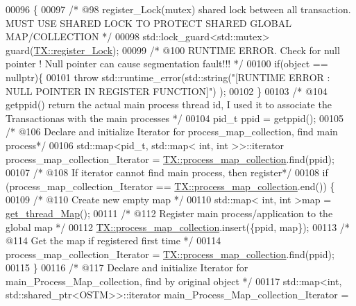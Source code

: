 \begin{DoxyCode}
00096                                              \{
00097     \textcolor{comment}{/* @98 register\_Lock(mutex) shared lock between all transaction. MUST USE SHARED LOCK TO PROTECT SHARED
       GLOBAL MAP/COLLECTION */}
00098     std::lock\_guard<std::mutex> guard(\hyperlink{class_t_x_aa688a8c96fa3cdf8cd92e267463536dc_aa688a8c96fa3cdf8cd92e267463536dc}{TX::register\_Lock});
00099     \textcolor{comment}{/* @100 RUNTIME ERROR. Check for null pointer ! Null pointer can cause segmentation fault!!! */}
00100     \textcolor{keywordflow}{if}(\textcolor{keywordtype}{object} == \textcolor{keyword}{nullptr})\{
00101         \textcolor{keywordflow}{throw} std::runtime\_error(std::string(\textcolor{stringliteral}{"[RUNTIME ERROR : NULL POINTER IN REGISTER FUNCTION]"}) );
00102     \}
00103     \textcolor{comment}{/* @104 getppid() return the actual main process thread id, I used it to associate the Transactionas
       with the main processes */}
00104     pid\_t ppid = getppid();
00105     \textcolor{comment}{/* @106 Declare and initialize Iterator for process\_map\_collection, find main process*/}
00106     std::map<pid\_t, std::map< int, int >>::iterator process\_map\_collection\_Iterator = 
      \hyperlink{class_t_x_a2e3cd2f52fd93cf6ef3eb3c1cb830b9f_a2e3cd2f52fd93cf6ef3eb3c1cb830b9f}{TX::process\_map\_collection}.find(ppid);
00107     \textcolor{comment}{/* @108 If iterator cannot find main process, then register*/}
00108     \textcolor{keywordflow}{if} (process\_map\_collection\_Iterator == \hyperlink{class_t_x_a2e3cd2f52fd93cf6ef3eb3c1cb830b9f_a2e3cd2f52fd93cf6ef3eb3c1cb830b9f}{TX::process\_map\_collection}.end()) \{
00109         \textcolor{comment}{/* @110 Create new empty map */}
00110         std::map< int, int >map =  \hyperlink{class_t_x_a3f5671423cb7b9f9c98f8a25f2a4b545_a3f5671423cb7b9f9c98f8a25f2a4b545}{get\_thread\_Map}();
00111         \textcolor{comment}{/* @112 Register main process/application to the global map */}
00112         \hyperlink{class_t_x_a2e3cd2f52fd93cf6ef3eb3c1cb830b9f_a2e3cd2f52fd93cf6ef3eb3c1cb830b9f}{TX::process\_map\_collection}.insert(\{ppid, map\});
00113         \textcolor{comment}{/* @114 Get the map if registered first time */}
00114         process\_map\_collection\_Iterator = \hyperlink{class_t_x_a2e3cd2f52fd93cf6ef3eb3c1cb830b9f_a2e3cd2f52fd93cf6ef3eb3c1cb830b9f}{TX::process\_map\_collection}.find(ppid);
00115     \}
00116     \textcolor{comment}{/* @117 Declare and initialize Iterator for main\_Process\_Map\_collection, find by original object */}
00117     std::map<int, std::shared\_ptr<OSTM>>::iterator main\_Process\_Map\_collection\_Iterator = 

\end{DoxyCode}
